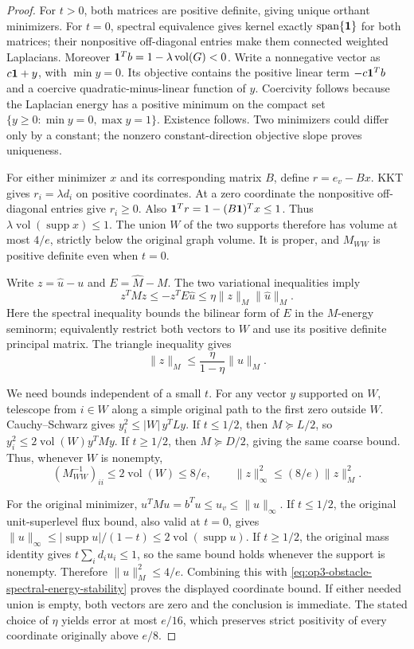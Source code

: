 \begin{proof}
For $t>0$, both matrices are positive definite, giving unique orthant
minimizers. For $t=0$, spectral equivalence gives kernel exactly
$\operatorname{span}\{\mathbf{1}\}$ for both matrices; their nonpositive
off-diagonal entries make them connected weighted Laplacians. Moreover
$\mathbf{1}^Tb=1-\lambda\operatorname{vol}(G)<0$. Write a nonnegative
vector as $c\mathbf{1}+y$, with $\min y=0$. Its objective contains the
positive linear term $-c\mathbf{1}^Tb$ and a coercive quadratic-minus-linear
function of $y$. Coercivity follows because the Laplacian energy has
a positive minimum on the compact set $\{y\geq0:\min y=0,\max y=1\}$.
Existence follows. Two minimizers could differ only by a constant;
the nonzero constant-direction objective slope proves uniqueness.

For either minimizer $x$ and its corresponding matrix $B$, define
$r=e_v-Bx$. KKT gives $r_i=\lambda d_i$ on positive coordinates.
At a zero coordinate the nonpositive off-diagonal entries give $r_i\geq0$.
Also $\mathbf{1}^Tr=1-(B\mathbf{1})^Tx\leq1$. Thus
$\lambda\operatorname{vol}(\operatorname{supp}x)\leq1$.
The union $W$ of the two supports therefore has volume at most $4/e$,
strictly below the original graph volume. It is proper, and $M_{WW}$
is positive definite even when $t=0$.

Write $z=\widehat u-u$ and $E=\widehat M-M$. The two variational
inequalities imply
\[
 z^TMz\leq-z^TE\widehat u
 \leq\eta\|z\|_M\|\widehat u\|_M.
\]
Here the spectral inequality bounds the bilinear form of $E$ in the
$M$-energy seminorm; equivalently restrict both vectors to $W$ and
use its positive definite principal matrix. The triangle inequality gives
\begin{equation}
 \|z\|_M\leq\frac{\eta}{1-\eta}\|u\|_M.
 \label{eq:op3-obstacle-spectral-energy-stability}
\end{equation}

We need bounds independent of a small $t$. For any vector $y$ supported
on $W$, telescope from $i\in W$ along a simple original path to the
first zero outside $W$. Cauchy--Schwarz gives
$y_i^2\leq |W|\,y^TLy$. If $t\leq1/2$, then $M\succeq L/2$,
so $y_i^2\leq2\operatorname{vol}(W)y^TMy$.
If $t\geq1/2$, then $M\succeq D/2$, giving the same coarse bound.
Thus, whenever $W$ is nonempty,
\[
 (M_{WW}^{-1})_{ii}\leq2\operatorname{vol}(W)\leq8/e,
 \qquad \|z\|_\infty^2\leq(8/e)\|z\|_M^2.
\]

For the original minimizer, $u^TMu=b^Tu\leq u_v\leq\|u\|_\infty$.
If $t\leq1/2$, the original unit-superlevel flux bound, also valid
at $t=0$, gives $\|u\|_\infty\leq
|\operatorname{supp}u|/(1-t)\leq2\operatorname{vol}(\operatorname{supp}u)$.
If $t\geq1/2$, the original mass identity gives $t\sum_i d_iu_i\leq1$,
so the same bound holds whenever the support is nonempty. Therefore
$\|u\|_M^2\leq4/e$. Combining this with
\cref{eq:op3-obstacle-spectral-energy-stability} proves the displayed
coordinate bound. If either needed union is empty, both vectors are zero
and the conclusion is immediate. The stated choice of $\eta$ yields
error at most $e/16$, which preserves strict positivity of every coordinate
originally above $e/8$.
\end{proof}

